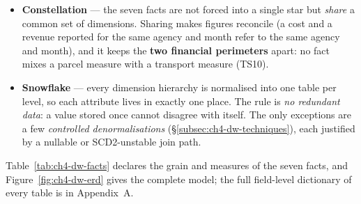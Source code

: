 \begin{itemize}[noitemsep]
    \item \textbf{Constellation} --- the seven facts are not forced into a single star but
          \emph{share} a common set of dimensions. Sharing makes figures reconcile (a cost and a
          revenue reported for the same agency and month refer to the same agency and month), and it
          keeps the \textbf{two financial perimeters} apart: no fact mixes a parcel measure with a
          transport measure (TS10).
    \item \textbf{Snowflake} --- every dimension hierarchy is normalised into one table per level, so
          each attribute lives in exactly one place. The rule is \emph{no redundant data}: a value
          stored once cannot disagree with itself. The only exceptions are a few \emph{controlled
          denormalisations} (\S\ref{subsec:ch4-dw-techniques}), each justified by a nullable or
          SCD2-unstable join path.
\end{itemize}

Table~\ref{tab:ch4-dw-facts} declares the grain and measures of the seven facts, and
Figure~\ref{fig:ch4-dw-erd} gives the complete model; the full field-level dictionary of every table is
in Appendix~A.

